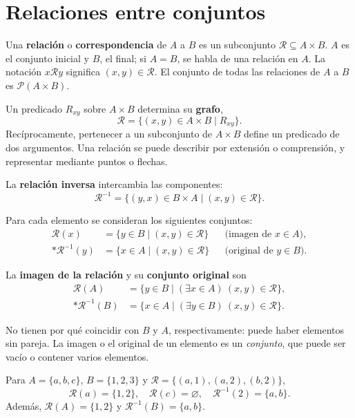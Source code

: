 \section{Relaciones entre conjuntos}
\label{sec:relaciones-conjuntos}

Una \textbf{relación} o \textbf{correspondencia} de $A$ a $B$ es un
subconjunto $\mathcal R\subseteq A\times B$. $A$ es el conjunto inicial
y $B$, el final; si $A=B$, se habla de una relación en $A$.
La notación $x\mathcal R y$ significa $(x,y)\in\mathcal R$.
El conjunto de todas las relaciones de $A$ a $B$ es $\mathcal P(A\times B)$.

Un predicado $R_{xy}$ sobre $A\times B$ determina su \textbf{grafo},
\[
 \mathcal R=\{(x,y)\in A\times B\mid R_{xy}\}.
\]
Recíprocamente, pertenecer a un subconjunto de $A\times B$ define un
predicado de dos argumentos. Una relación se puede describir por
extensión o comprensión, y representar mediante puntos o flechas.

La \textbf{relación inversa} intercambia las componentes:
\[
 \mathcal R^{-1}
   =\{(y,x)\in B\times A\mid(x,y)\in\mathcal R\}.
\]
\begin{samepage}
Para cada elemento se consideran los siguientes conjuntos:
\begin{align*}
 \mathcal R(x)&=\{y\in B\mid(x,y)\in\mathcal R\}
          &&\text{(imagen de $x\in A$)},\\*
 \mathcal R^{-1}(y)&=\{x\in A\mid(x,y)\in\mathcal R\}
          &&\text{(original de $y\in B$)}.
\end{align*}
\end{samepage}
\begin{samepage}
La \textbf{imagen de la relación} y su \textbf{conjunto original} son
\begin{align*}
 \mathcal R(A)&=\{y\in B\mid(\exists x\in A)\ (x,y)\in\mathcal R\},\\*
 \mathcal R^{-1}(B)&=\{x\in A\mid(\exists y\in B)\ (x,y)\in\mathcal R\}.
\end{align*}
\end{samepage}
No tienen por qué coincidir con $B$ y $A$, respectivamente: puede haber
elementos sin pareja. La imagen o el original de un elemento es un
\emph{conjunto}, que puede ser vacío o contener varios elementos.

\begin{ejemplo}
Para $A=\{a,b,c\}$, $B=\{1,2,3\}$ y
$\mathcal R=\{(a,1),(a,2),(b,2)\}$,
\[
 \mathcal R(a)=\{1,2\},\quad \mathcal R(c)=\varnothing,\quad
 \mathcal R^{-1}(2)=\{a,b\}.
\]
Además, $\mathcal R(A)=\{1,2\}$ y $\mathcal R^{-1}(B)=\{a,b\}$.
\end{ejemplo}

